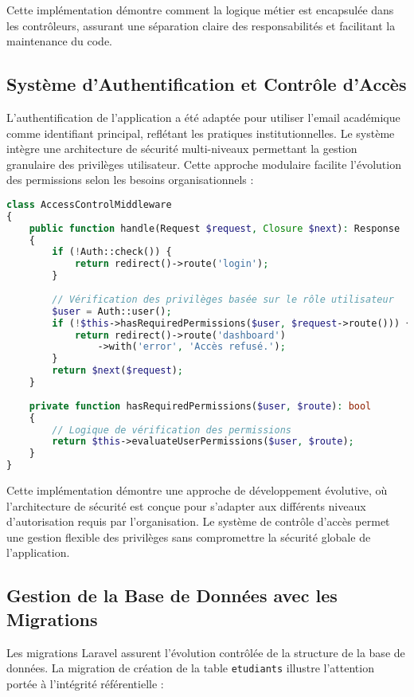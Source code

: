 \documentclass[12pt,a4paper]{report}
\begin{document}
Cette implémentation démontre comment la logique métier est encapsulée dans les contrôleurs, assurant une séparation claire des responsabilités et facilitant la maintenance du code.

\subsection{Système d'Authentification et Contrôle d'Accès}

L'authentification de l'application a été adaptée pour utiliser l'email académique comme identifiant principal, reflétant les pratiques institutionnelles. Le système intègre une architecture de sécurité multi-niveaux permettant la gestion granulaire des privilèges utilisateur. Cette approche modulaire facilite l'évolution des permissions selon les besoins organisationnels :

\begin{lstlisting}[language=PHP]
class AccessControlMiddleware
{
    public function handle(Request $request, Closure $next): Response
    {
        if (!Auth::check()) {
            return redirect()->route('login');
        }
        
        // Vérification des privilèges basée sur le rôle utilisateur
        $user = Auth::user();
        if (!$this->hasRequiredPermissions($user, $request->route())) {
            return redirect()->route('dashboard')
                ->with('error', 'Accès refusé.');
        }
        return $next($request);
    }
    
    private function hasRequiredPermissions($user, $route): bool
    {
        // Logique de vérification des permissions
        return $this->evaluateUserPermissions($user, $route);
    }
}
\end{lstlisting}

Cette implémentation démontre une approche de développement évolutive, où l'architecture de sécurité est conçue pour s'adapter aux différents niveaux d'autorisation requis par l'organisation. Le système de contrôle d'accès permet une gestion flexible des privilèges sans compromettre la sécurité globale de l'application.

\subsection{Gestion de la Base de Données avec les Migrations}

Les migrations Laravel assurent l'évolution contrôlée de la structure de la base de données. La migration de création de la table \texttt{etudiants} illustre l'attention portée à l'intégrité référentielle :
\end{document}
